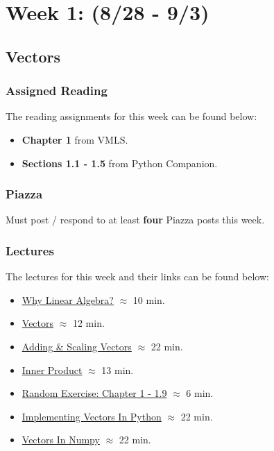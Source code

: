 \clearpage
\chapter{Week 1: (8/28 - 9/3)}

\section{Vectors}

\subsection{Assigned Reading}

The reading assignments for this week can be found below:

\begin{itemize}
    \item \textbf{Chapter 1} from VMLS.
    \item \textbf{Sections 1.1 - 1.5} from Python Companion.
\end{itemize}

\subsection{Piazza}

Must post / respond to at least \textbf{four} Piazza posts this week.  

\subsection{Lectures}

The lectures for this week and their links can be found below:

\begin{itemize}
    \item \href{https://applied.cs.colorado.edu/mod/hvp/view.php?id=50664}{Why Linear Algebra?} $\approx$ 10 min.
    \item \href{https://applied.cs.colorado.edu/mod/hvp/view.php?id=50666}{Vectors} $\approx$ 12 min.
    \item \href{https://applied.cs.colorado.edu/mod/hvp/view.php?id=50667}{Adding \& Scaling Vectors} $\approx$ 22 min.
    \item \href{https://applied.cs.colorado.edu/mod/hvp/view.php?id=50668}{Inner Product} $\approx$ 13 min.
    \item \href{https://applied.cs.colorado.edu/mod/hvp/view.php?id=50669}{Random Exercise: Chapter 1 - 1.9} $\approx$ 6 min.
    \item \href{https://applied.cs.colorado.edu/mod/hvp/view.php?id=50670}{Implementing Vectors In Python} $\approx$ 22 min.
    \item \href{https://applied.cs.colorado.edu/mod/hvp/view.php?id=50671}{Vectors In Numpy} $\approx$ 22 min.
\end{itemize}

